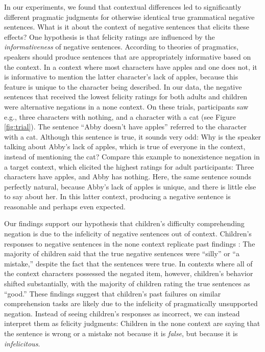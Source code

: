 \documentclass[man, noapacite]{apa2}
\begin{document}
In our experiments, we found that contextual differences led to significantly different pragmatic judgments for otherwise identical true grammatical negative sentences. What is it about the context of negative sentences that elicits these effects? One hypothesis is that felicity ratings are influenced by the \emph{informativeness} of negative sentences. According to theories of pragmatics, speakers should produce sentences that are appropriately informative based on the context. In a context where most characters have apples and one does not, it is informative to mention the latter character's lack of apples, because this feature is unique to the character being described. In our data, the negative sentences that received the lowest felicity ratings for both adults and children were alternative negations in a none context. On these trials, participants saw e.g., three characters with nothing, and a character with a cat (see Figure \ref{fig:trial}). The sentence ``Abby doesn't have apples'' referred to the character with a cat. Although this sentence is true, it sounds very odd: Why is the speaker talking about Abby's lack of apples, which is true of everyone in the context, instead of mentioning the cat? Compare this example to nonexistence negation in a target context, which elicited the highest ratings for adult participants: Three characters have apples, and Abby has nothing. Here, the same sentence sounds perfectly natural, because Abby's lack of apples is unique, and there is little else to say about her. In this latter context, producing a negative sentence is reasonable and perhaps even expected.

Our findings support our hypothesis that children's difficulty comprehending negation is due to the infelicity of negative sentences out of context.  Children's responses to negative sentences in the none context replicate past findings \cite{kim1985}: The majority of children said that the true negative sentences were ``silly'' or ``a mistake,'' despite the fact that the sentences were true. In contexts where all of the context characters possessed the negated item, however, children's behavior shifted substantially, with the majority of children rating the true sentences as ``good.'' These findings suggest that children's past failures on similar comprehension tasks are likely due to the infelicity of pragmatically unsupported negation. Instead of seeing children's responses as incorrect, we can instead interpret them as felicity judgments: Children in the none context are saying that the sentence is wrong or a mistake not because it is \emph{false}, but because it is \emph{infelicitous}.
\end{document}
